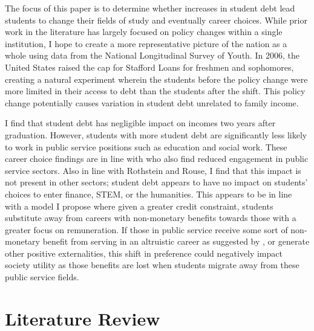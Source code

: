\documentclass[12pt]{article}
\begin{document}
	The focus of this paper is to determine whether increases in student debt lead students to change their fields of study and eventually career choices. While prior work in the literature has largely focused on policy changes within a single institution, I hope to create a more representative picture of the nation as a whole using data from the National Longitudinal Survey of Youth. In 2006, the United States raised the cap for Stafford Loans for freshmen and sophomores, creating a natural experiment wherein the students before the policy change were more limited in their access to debt than the students after the shift. This policy change potentially causes variation in student debt unrelated to family income. 
	
	I find that student debt has negligible impact on incomes two years after graduation. However, students with more student debt are significantly less likely to work in public service positions such as education and social work. These career choice findings are in line with \textcite{rothstein2011} who also find reduced engagement in public service sectors. Also in line with Rothstein and Rouse, I find that this impact is not present in other sectors; student debt appears to have no impact on students' choices to enter finance, STEM, or the humanities. This appears to be in line with a model I propose where given a greater credit constraint, students substitute away from careers with non-monetary benefits towards those with a greater focus on remuneration. If those in public service receive some sort of non-monetary benefit from serving in an altruistic career as suggested by \textcite{hanson1995}, or generate other positive externalities, this shift in preference could negatively impact society utility as those benefits are lost when students migrate away from these public service fields.
	
	\section{Literature Review}
	
\end{document}
